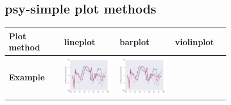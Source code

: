 \documentclass[
11pt, %
english, %
singlespacing, %
headsepline, %
]{MastersDoctoralThesis} %
\begin{document}
\begin{NoHyper}
\begin{refsection}
\begin{subappendices}
	\section{psy-simple plot methods}  \label{sec:psy-simple-plotmethods}

		\begin{tabular}[c]{l|p{0.25\linewidth}|p{0.25\linewidth}|p{0.25\linewidth}|}
			\toprule
			\textbf{Plot method} & lineplot & barplot & violinplot \\
			\hline
			\textbf{Example} & 
				\includegraphics[width=\linewidth, page=1]{psyplot-figures/psy-simple-demo.pdf} &
				\includegraphics[width=\linewidth, page=2]{psyplot-figures/psy-simple-demo.pdf} &

\end{tabular}
\end{subappendices}
\end{refsection}
\end{NoHyper}
\end{document}
